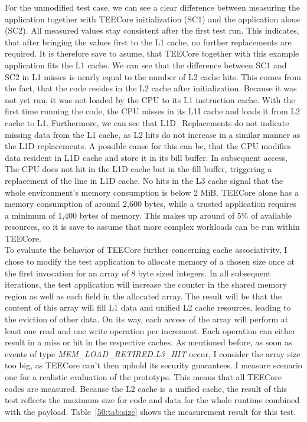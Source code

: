For the unmodified test case, we can see a clear difference between measuring
the application together with TEECore initialization (SC1) and the application
alone (SC2). All measured values stay consistent after the first test run. This
indicates, that after bringing the values first to the L1 cache, no further
replacements are required. It is therefore save to asume, that TEECore together
with this example application fits the L1 cache. We can see that the difference
between SC1 and SC2 in L1 misses is nearly equal to the number of L2 cache hits.
This comes from the fact, that the code resides in the L2 cache after
initialization. Because it was not yet run, it was not loaded by the CPU to its
L1 instruction cache. With the first time running the code, the CPU misses in
its L1I cache and loads it from L2 cache to L1. Furthermore, we can see that
L1D\_Replacements do not indicate missing data from the L1 cache, as L2 hits do
not increase in a similar manner as the L1D replacements. A possible cause for
this can be, that the CPU modifies data resident in L1D cache and store it in
its bill buffer. In subsequent access, The CPU does not hit in the L1D cache but
in the fill buffer, triggering a replacement of the line in L1D cache. No hits
in the L3 cache signal that the whole environment's memory consumption is below
2 MiB. TEECore alone has a memory consumption of around 2,600 bytes, while a
trusted application requires a minimum of 1,400 bytes of memory. This makes up
around of 5\% of available resources, so it is save to assume that more complex
workloads can be run within TEECore.\\

To evaluate the behavior of TEECore further concerning cache associativity, I
chose to modify the test application to allocate memory of a chosen size once at
the first invocation for an array of 8 byte sized integers. In all subsequent
iterations, the test application will increase the counter in the shared memory
region as well as each field in the allocated array. The result will be that the
content of this array will fill L1 data and unified L2 cache resources, leading
to the eviction of other data. On its way, each access of the array will
perform at least one read and one write operation per increment. Each operation
can either result in a miss or hit in the respective caches. As mentioned
before, as soon as events of type \textit{MEM\_LOAD\_RETIRED.L3\_HIT} occur, I
consider the array size too big, as TEECore can't then uphold its security
guarantees. I measure scenario one for a realistic evaluation of the prototype.
This means that all TEECore codes are measured. Because the L2 cache is a
unified cache, the result of this test reflects the maximum size for code and
data for the whole runtime combined with the payload. Table~\ref{50:tab:size}
shows the measurement result for this test.

